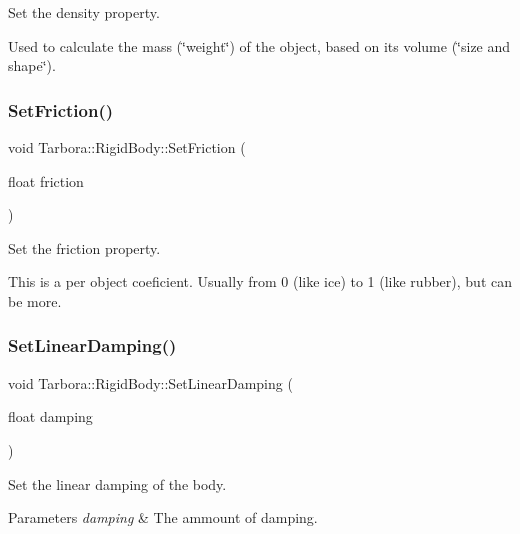 Set the density property. 

Used to calculate the mass (\char`\"{}weight\char`\"{}) of the object, based on its volume (\char`\"{}size and shape\char`\"{}). \mbox{\label{classTarbora_1_1RigidBody_a9408bdeb536881e29f3706bb061220d2}} 
\subsubsection{\texorpdfstring{Set\+Friction()}{SetFriction()}}
{\footnotesize\ttfamily void Tarbora\+::\+Rigid\+Body\+::\+Set\+Friction (\begin{DoxyParamCaption}\item[{float}]{friction }\end{DoxyParamCaption})\hspace{0.3cm}{\ttfamily [inline]}}



Set the friction property. 

This is a per object coeficient. Usually from 0 (like ice) to 1 (like rubber), but can be more. \mbox{\label{classTarbora_1_1RigidBody_a8140640963647cae49e1b9b78ab00b9b}} 
\subsubsection{\texorpdfstring{Set\+Linear\+Damping()}{SetLinearDamping()}}
{\footnotesize\ttfamily void Tarbora\+::\+Rigid\+Body\+::\+Set\+Linear\+Damping (\begin{DoxyParamCaption}\item[{float}]{damping }\end{DoxyParamCaption})}



Set the linear damping of the body. 


\begin{DoxyParams}{Parameters}
{\em damping} & The ammount of damping. \\
\hline
\end{DoxyParams}
\mbox{\label{classTarbora_1_1RigidBody_a0ec675847bf2c6e5f34002eab0c29ef0}} 
